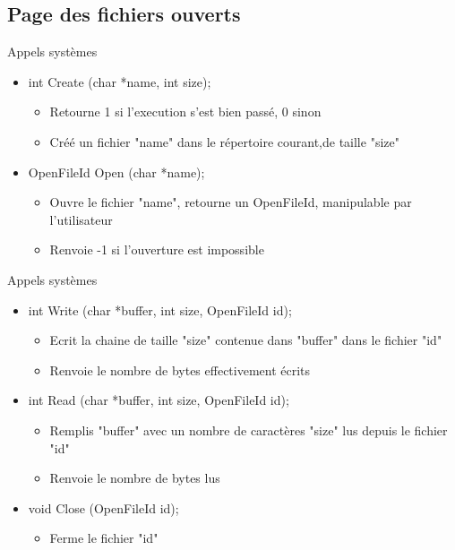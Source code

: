 \documentclass{beamer}
\begin{document}
\subsection{Page des fichiers ouverts}


\begin{frame}
	\begin{block}{Appels systèmes}
		\begin{itemize}
			\item<1-> int Create (char *name, int size);
			\begin{itemize}
				\item<1->Retourne 1 si l'execution s'est bien passé, 0 sinon
				\item<1->Créé un fichier "name" dans le répertoire courant,de taille "size"
			\end{itemize}
			\item<2-> OpenFileId Open (char *name);
			\begin{itemize}
				\item<1->Ouvre le fichier "name", retourne un OpenFileId, manipulable par l'utilisateur
				\item<1->Renvoie -1 si l'ouverture est impossible
			\end{itemize}			
		\end{itemize}
	\end{block}
\end{frame}

\begin{frame}
	\begin{block}{Appels systèmes}
		\begin{itemize}
			\item<1-> int Write (char *buffer, int size, OpenFileId id);
			\begin{itemize}
				\item<1->Ecrit la chaine de taille "size" contenue dans "buffer" dans le fichier "id"
				\item<1->Renvoie le nombre de bytes effectivement écrits
			\end{itemize}
			\item<2-> int Read (char *buffer, int size, OpenFileId id);
			\begin{itemize}
				\item<1->Remplis "buffer" avec un nombre de caractères "size" lus depuis le fichier "id"
				\item<1->Renvoie le nombre de bytes lus
			\end{itemize}	
			\item<3-> void Close (OpenFileId id);
			\begin{itemize}
				\item<1->Ferme le fichier "id"
			\end{itemize}		
		\end{itemize}
	\end{block}
\end{frame}
\end{document}
